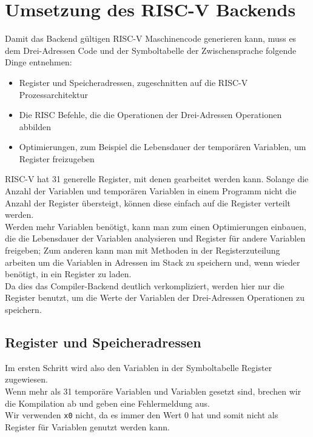 \chapter{Umsetzung des RISC-V Backends}
\label{chap:build:backend}

Damit das Backend gültigen RISC-V Maschinencode generieren kann, muss es dem Drei-Adressen Code und der Symboltabelle der Zwischensprache folgende Dinge entnehmen:

\begin{itemize}
  \item{Register und Speicheradressen, zugeschnitten auf die RISC-V Prozessarchitektur}
  \item{Die RISC Befehle, die die Operationen der Drei-Adressen Operationen abbilden}
  \item{Optimierungen, zum Beispiel die Lebensdauer der temporären Variablen, um Register freizugeben}
\end{itemize}

RISC-V hat 31 generelle Register, mit denen gearbeitet werden kann.
Solange die Anzahl der Variablen und temporären Variablen in einem Programm nicht die Anzahl der Register übersteigt, können diese einfach auf die Register verteilt werden.\\
Werden mehr Variablen benötigt, kann man zum einen Optimierungen einbauen, die die Lebensdauer der Variablen analysieren und Register für andere Variablen freigeben; 
Zum anderen kann man mit Methoden in der Registerzuteilung arbeiten um die Variablen in Adressen im Stack zu speichern und, wenn wieder benötigt, in ein Register zu laden.\\
Da dies das Compiler-Backend deutlich verkompliziert, werden hier nur die Register benutzt, um die Werte der Variablen der Drei-Adressen Operationen zu speichern.\\

\section{Register und Speicheradressen}

Im ersten Schritt wird also den Variablen in der Symboltabelle Register zugewiesen.\\
Wenn mehr als 31 temporäre Variablen und Variablen gesetzt sind, brechen wir die Kompilation ab und geben eine Fehlermeldung aus.\\
Wir verwenden \texttt{x0} nicht, da es immer den Wert 0 hat und somit nicht als Register für Variablen genutzt werden kann.\\

